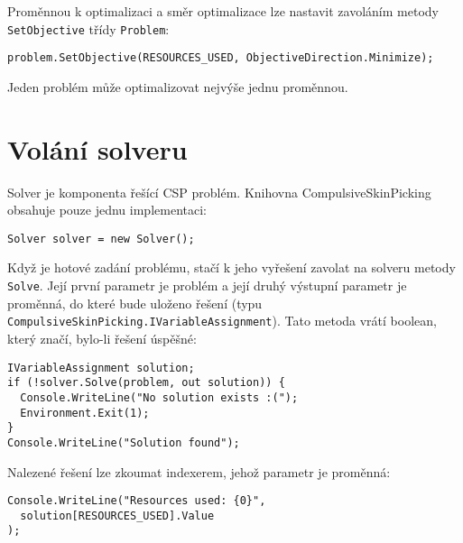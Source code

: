 \documentclass[a4paper]{article}
\begin{document}
Proměnnou k optimalizaci a směr optimalizace lze nastavit zavoláním metody
\texttt{SetObjective} třídy \texttt{Problem}:
\begin{lstlisting}
problem.SetObjective(RESOURCES_USED, ObjectiveDirection.Minimize);
\end{lstlisting}

Jeden problém může optimalizovat nejvýše jednu proměnnou.

\section{Volání solveru}
Solver je komponenta řešící CSP problém. Knihovna CompulsiveSkinPicking obsahuje
pouze jednu implementaci:
\begin{lstlisting}
Solver solver = new Solver();
\end{lstlisting}
Když je hotové zadání problému, stačí k jeho vyřešení zavolat na solveru metody
\texttt{Solve}. Její první parametr je problém a její druhý výstupní parametr je
proměnná, do které bude uloženo řešení (typu
\texttt{CompulsiveSkinPicking.IVariableAssignment}). Tato metoda vrátí boolean, který značí,
bylo-li řešení úspěšné:
\begin{lstlisting}
IVariableAssignment solution;
if (!solver.Solve(problem, out solution)) {
  Console.WriteLine("No solution exists :(");
  Environment.Exit(1);
}
Console.WriteLine("Solution found");
\end{lstlisting}

Nalezené řešení lze zkoumat indexerem, jehož parametr je proměnná:
\begin{lstlisting}
Console.WriteLine("Resources used: {0}",
  solution[RESOURCES_USED].Value
);
\end{lstlisting}
\end{document}
